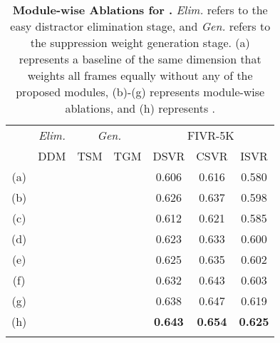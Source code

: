 \documentclass[10pt,twocolumn,letterpaper]{article}
\newcommand{\cmark}{\ding{51}}
\begin{document}
    \begin{table}[!t] \footnotesize
        \centering
        \begin{tabular}{c|ccc|ccc}
            \cmidrule[\heavyrulewidth]{1-7}
            \morecmidrules
            \cmidrule[\heavyrulewidth]{1-7}
\multicolumn{1}{c}{\multirow{2}{*}[-.3em]{}}
            & \multicolumn{1}{|c|}{\textit{Elim.}}  & \multicolumn{2}{c|}{\textit{Gen.}} & \multicolumn{3}{c}{FIVR-5K} \\ \cmidrule(){2-7} 
           
                &\multicolumn{1}{c|}{DDM} & TSM    & TGM    & DSVR  & CSVR  & ISVR  \\ \midrule 
            (a) &       &        &        & 0.606 &	0.616 &	0.580 \\ \midrule
            (b) &\cmark &        &        & 0.626 &	0.637 &	0.598 \\ \midrule
            (c) &       & \cmark &        & 0.612 &	0.621 &	0.585 \\
            (d) &       &        & \cmark & 0.623 &	0.633 &	0.600 \\
            (e) &       & \cmark & \cmark & 0.625 &	0.635 &	0.602 \\ \midrule 
            (f) &\cmark & \cmark &        & 0.632 &	0.643 &	0.603 \\ 
            (g) &\cmark &        & \cmark & 0.638 &	0.647 &	0.619 \\ \midrule
            (h) &\cmark & \cmark & \cmark & \textbf{0.643} & \textbf{0.654} & \textbf{0.625} \\
            \cmidrule[\heavyrulewidth]{1-7}
            \morecmidrules
            \cmidrule[\heavyrulewidth]{1-7}
        \end{tabular}
        \vspace{3mm}
        \caption{\textbf{Module-wise Ablations for \textbf{.} }\textit{Elim.} refers to the easy distractor elimination stage, and \textit{Gen.} refers to the suppression weight generation stage. (a) represents a baseline of the same dimension that weights all frames equally without any of the proposed modules, (b)-(g) represents module-wise ablations, and (h) represents . \vspace{-0mm}}
        \label{tab:module_ablation512}
    \end{table}
\end{document}

